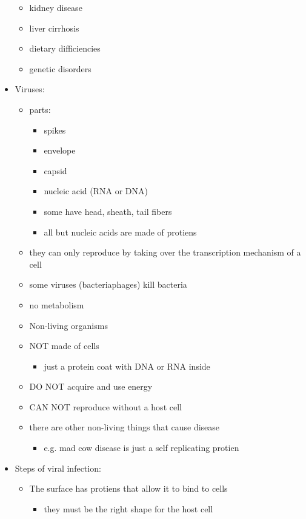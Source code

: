 \documentclass{article}
\theoremstyle{definition}
\begin{document}
\begin{itemize}
\begin{itemize}
			\item kidney disease
			\item liver cirrhosis
			\item dietary difficiencies
			\item genetic disorders
		\end{itemize}
	\item Viruses:
		\begin{itemize}
			\item parts:
				\begin{itemize}
					\item spikes
					\item envelope
					\item capsid
					\item nucleic acid (RNA or DNA)
					\item some have head, sheath, tail fibers
					\item all but nucleic acids are made of protiens
				\end{itemize}
			\item they can only reproduce by taking over the transcription mechanism of a cell
			\item some viruses (bacteriaphages) kill bacteria
			\item no metabolism
			\item Non-living organisms
			\item NOT made of cells
				\begin{itemize}
					\item just a protein coat with DNA or RNA inside
				\end{itemize}
			\item DO NOT acquire and use energy
			\item CAN NOT reproduce without a host cell
			\item there are other non-living things that cause disease
				\begin{itemize}
					\item e.g. mad cow disease is just a self replicating protien
				\end{itemize}
		\end{itemize}
	\item Steps of viral infection:
		\begin{itemize}
			\item The surface has protiens that allow it to bind to cells
				\begin{itemize}
					\item they must be the right shape for the host cell

\end{itemize}
\end{itemize}
\end{itemize}
\end{document}
